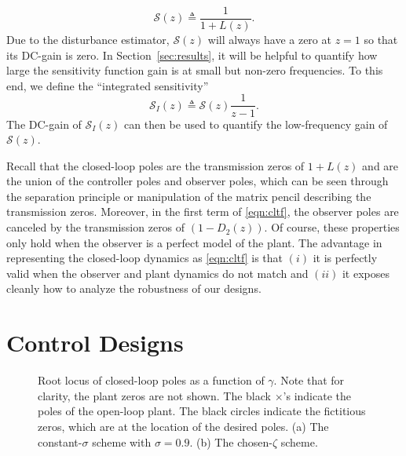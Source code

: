 \documentclass[twocolumn,twoside]{IEEEtran}
\begin{document}
\begin{equation}
  \mathcal{S}(z)\triangleq \frac{1}{1+L(z)}.\label{eqn:Sens}
\end{equation}
Due to the disturbance estimator, $\mathcal{S}(z)$ will always have a zero at $z=1$ so that its DC-gain is zero. In Section~\ref{sec:results}, it will be helpful to quantify how large the sensitivity function gain is at small but non-zero frequencies. To this end, we define the ``integrated sensitivity''
\begin{equation}
\mathcal{S}_I(z)\triangleq \mathcal{S}(z)\frac{1}{z-1} \label{eqn:S_int}.
\end{equation}
The DC-gain of $\mathcal{S}_I(z)$ can then be used to quantify the low-frequency gain of $\mathcal{S}(z)$.

Recall that the closed-loop poles are the transmission zeros of $1+L(z)$ and are the union of the controller poles and observer poles, which can be seen through the separation principle or manipulation of the matrix pencil describing the transmission zeros. Moreover, in the first term of \eqref{eqn:cltf}, the observer poles are canceled by the transmission zeros of $(1-D_2(z))$. Of course, these properties only hold when the observer is a perfect model of the plant. The advantage in representing the closed-loop dynamics as \eqref{eqn:cltf} is that $(i)$ it is perfectly valid when the observer and plant dynamics do not match and $(ii)$ it exposes cleanly how to analyze the robustness of our designs. 


%   


\section{Control Designs}\label{sec:tune}
\begin{figure*}
    \begin{subfigure}{0.48\textwidth}
  
\caption{}
  \label{fig:lqr_locus_cs}
\end{subfigure}
\hfill
\begin{subfigure}{0.48\textwidth}
  
  \caption{}
  \label{fig:lqr_locus_cz}
\end{subfigure}
\caption{Root locus of closed-loop poles as a function of $\gamma$. Note that for clarity, the plant zeros are not shown. The black $\times$'s indicate the poles of the open-loop plant. The black circles indicate the fictitious zeros, which are at the location of the desired poles. (a) The constant-$\sigma$ scheme with $\sigma=0.9$. (b) The chosen-$\zeta$ scheme.}
\label{fig:lqr_locus}
\end{figure*}
\end{document}
